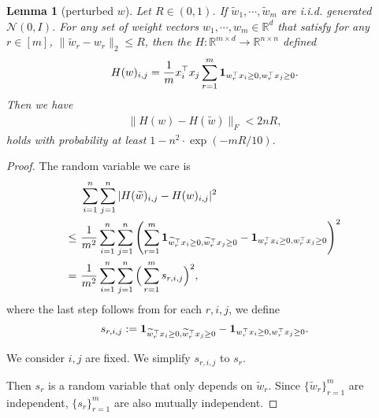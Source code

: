 \documentclass[11pt]{article}
\newcommand{\N}{\mathcal{N}}
\newcommand{\wt}{\widetilde}
\newcommand{\R}{\mathbb{R}}
\newtheorem{lemma}[theorem]{Lemma}
\begin{document}
\begin{lemma}[perturbed $w$]\label{lem:3.2}
Let $R \in (0,1)$. If $\wt{w}_1, \cdots, \wt{w}_m$ are i.i.d. generated ${\N}(0,I)$. For any set of weight vectors $w_1, \cdots, w_m \in \R^d$ that satisfy for any $r\in [m]$, $\| \wt{w}_r - w_r \|_2 \leq R$, then the $H : \R^{m \times d} \rightarrow \R^{n \times n}$ defined
\begin{align*}
    H(w)_{i,j} =  \frac{1}{m} x_i^\top x_j \sum_{r=1}^m {\bf 1}_{ w_r^\top x_i \geq 0, w_r^\top x_j \geq 0 } .
\end{align*}
Then we have
\begin{align*}
\| H (w) - H(\wt{w}) \|_F < 2 n R,
\end{align*}
holds with probability at least $1-n^2 \cdot \exp(-m R /10)$.
\end{lemma}
\begin{proof}


The random variable we care is
{%
\begin{align*}
& ~ \sum_{i=1}^n \sum_{j=1}^n | H(\wt{w})_{i,j} - H(w)_{i,j} |^2 \\
\leq & ~ \frac{1}{m^2} \sum_{i=1}^n \sum_{j=1}^n \left( \sum_{r=1}^m {\bf 1}_{ \wt{w}_r^\top x_i \geq 0, \wt{w}_r^\top x_j \geq 0} - {\bf 1}_{ w_r^\top x_i \geq 0 , w_r^\top x_j \geq 0 } \right)^2 \\
= & ~ \frac{1}{m^2} \sum_{i=1}^n \sum_{j=1}^n  \Big( \sum_{r=1}^m s_{r,i,j} \Big)^2 ,
\end{align*}
}
where the last step follows from for each $r,i,j$, we define
\begin{align*}
s_{r,i,j} :=  {\bf 1}_{ \wt{w}_r^\top x_i \geq 0, \wt{w}_r^\top x_j \geq 0} - {\bf 1}_{ w_r^\top x_i \geq 0 , w_r^\top x_j \geq 0 } .
\end{align*} 

We consider $i,j$ are fixed. We simplify $s_{r,i,j}$ to $s_r$.

Then $s_r$ is a random variable that only depends on $\wt{w}_r$.
Since $\{\wt{w}_r\}_{r=1}^m$ are independent,
$\{s_r\}_{r=1}^m$ are also mutually independent.


\end{proof}
\end{document}
